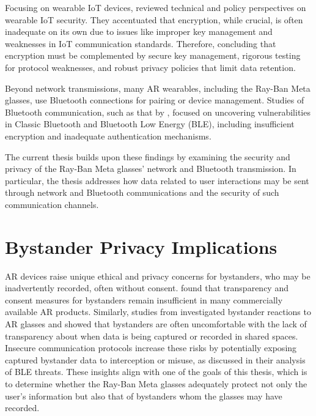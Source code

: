 Focusing on wearable IoT devices, \citet{DMello2018WearableIS} reviewed technical and policy perspectives on wearable IoT security. They accentuated that encryption, while crucial, is often inadequate on its own due to issues like improper key management and weaknesses in IoT communication standards. Therefore, concluding that encryption must be complemented by secure key management, rigorous testing for protocol weaknesses, and robust privacy policies that limit data retention. 

Beyond network transmissions, many AR wearables, including the Ray-Ban Meta glasses, use Bluetooth connections for pairing or device management. Studies of Bluetooth communication, such as that by \citet{nagrare2023bleprotocoliotdevices}, focused on uncovering vulnerabilities in Classic Bluetooth and Bluetooth Low Energy (BLE), including insufficient encryption and inadequate authentication mechanisms. 

The current thesis builds upon these findings by examining the security and privacy of the Ray-Ban Meta glasses' network and Bluetooth transmission. In particular, the thesis addresses how data related to user interactions may be sent through network and Bluetooth communications and the security of such communication channels.


\section*{Bystander Privacy Implications}
AR devices raise unique ethical and privacy concerns for bystanders, who may be inadvertently recorded, often without consent. \citet{Gallardo2023SpeculativePC} found that transparency and consent measures for bystanders remain insufficient in many commercially available AR products. Similarly, studies from \citet{Denning2014InSitu} investigated bystander reactions to AR glasses and showed that bystanders are often uncomfortable with the lack of transparency about when data is being captured or recorded in shared spaces. Insecure communication protocols increase these risks by potentially exposing captured bystander data to interception or misuse, as \citet{nagrare2023bleprotocoliotdevices} discussed in their analysis of BLE threats. These insights align with one of the goals of this thesis, which is to determine whether the Ray-Ban Meta glasses adequately protect not only the user's information but also that of bystanders whom the glasses may have recorded.

